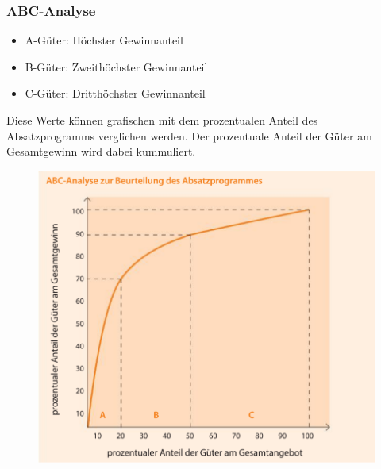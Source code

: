 \documentclass[12pt]{article}
\begin{document}
\subsubsection{ABC-Analyse}
\begin{itemize}
    \item A-Güter: Höchster Gewinnanteil
    \item B-Güter: Zweithöchster Gewinnanteil
    \item C-Güter: Dritthöchster Gewinnanteil
\end{itemize}
Diese Werte können grafischen mit dem prozentualen Anteil des Absatzprogramms verglichen werden. Der prozentuale Anteil der Güter am Gesamtgewinn wird dabei kummuliert.
\begin{figure}[h]
    \begin{center}
        \includegraphics[scale=0.4]{ABC-Analyse.png}
    \end{center}
\end{figure}

\newpage
\end{document}
